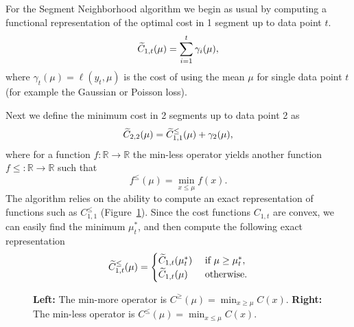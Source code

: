 \documentclass{article}
\newcommand{\RR}{\mathbb R}
\begin{document}
For the Segment Neighborhood algorithm we begin as usual by computing
a functional representation of the optimal cost in 1 segment up to
data point $t$. 
\begin{equation*}
  \label{eq:C1b}
  \widetilde{C}_{1,t}(\mu) = \sum_{i=1}^t \gamma_i(\mu),
\end{equation*}
where $\gamma_t(\mu)=\ell(y_t, \mu)$ is the cost of using the mean
$\mu$ for single data point $t$ (for example the Gaussian or Poisson
loss).

Next we define the minimum cost in 2 segments up to data point 2 as
\begin{equation*}
  \label{eq:C22}
  \widetilde{C}_{2,2}(\mu) = \widetilde{C}_{1,1}^{\leq}(\mu) + \gamma_2(\mu),
\end{equation*}
where for a function $f:\RR\rightarrow\RR$ the min-less operator
yields another function $f\leq:\RR\rightarrow\RR$ such that
\begin{equation}
  \label{eq:min-less}
  f^{\leq}(\mu) = \min_{x\leq \mu} f(x).
\end{equation}
The algorithm relies on the ability to compute an exact representation
of functions such as $C_{1,1}^{\leq}$
(Figure~\ref{fig:min-operators}). Since the cost functions $C_{1,t}$
are convex, we can easily find the minimum $\mu_t^*$, and then compute
the following exact representation
\begin{equation*}
  \widetilde{C}_{1,t}^\leq(\mu)=
  \begin{cases}
    \widetilde{C}_{1,t}(\mu_t^*) & \text{ if } \mu \geq \mu_t^*,\\
    \widetilde{C}_{1,t}(\mu) & \text{ otherwise.}
  \end{cases}
\end{equation*}

\begin{figure}[!t]
  \parbox{3in}{
    \begin{center}
    \end{center}
  }
  \parbox{3in}{
    \begin{center}
    \end{center}
  }
  \caption{\label{fig:min-operators} \textbf{Left:} The min-more
    operator is $C^{\geq}(\mu)=\min_{x\geq \mu}C(x)$. \textbf{Right:}
    The min-less operator is $C^{\leq}(\mu)=\min_{x\leq
      \mu}C(x)$.}
\end{figure}
\end{document}
